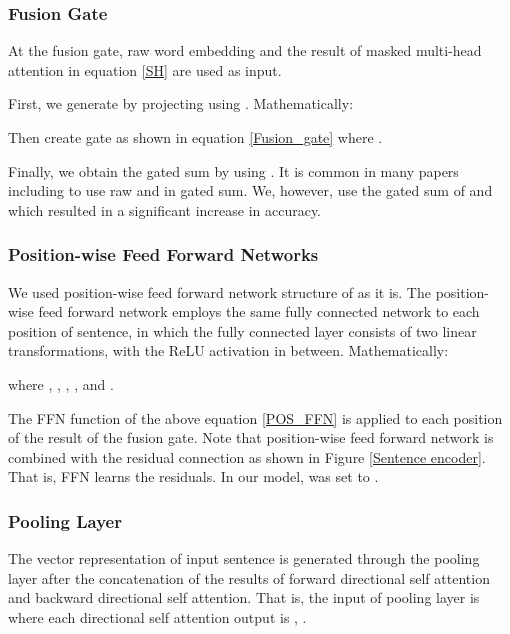 \documentclass[11pt,letterpaper]{article}
\renewcommand*{\thefootnote}{\fnsymbol{footnote}}
\begin{document}
\renewcommand*{\thefootnote}{\arabic{footnote}}

\subsubsection{Fusion Gate}
\label{fusion_gate}

At the fusion gate, raw word embedding  and the result of masked multi-head attention  in equation \ref{SH} are used as input. 



First, we generate  by projecting  using . Mathematically: 



Then create gate  as shown in equation \ref{Fusion_gate} where . 



 Finally, we obtain the gated sum by using . It is common in many papers including \citet{DiSAN} to use raw  and  in gated sum. We, however, use the gated sum of  and  which resulted in a significant increase in accuracy.

\subsubsection{Position-wise Feed Forward Networks}

We used position-wise feed forward network structure of \citet{AttentionAYN} as it is. The position-wise feed forward network employs the same fully connected network to each position of sentence, in which the fully connected layer consists of two linear transformations, with the ReLU activation in between. Mathematically:


where , , , , and .

The FFN function of the above equation \ref{POS_FFN} is applied to each position of the result of the fusion gate. Note that position-wise feed forward network is combined with the residual connection as shown in Figure \ref{Sentence encoder}. That is, FFN learns the residuals. In our model,  was set to .

\subsubsection{Pooling Layer}

The vector representation of input sentence is generated through the pooling layer after the concatenation of the results of forward directional self attention and backward directional self attention. That is, the input of pooling layer is  where each directional self attention output is , . 
\end{document}
